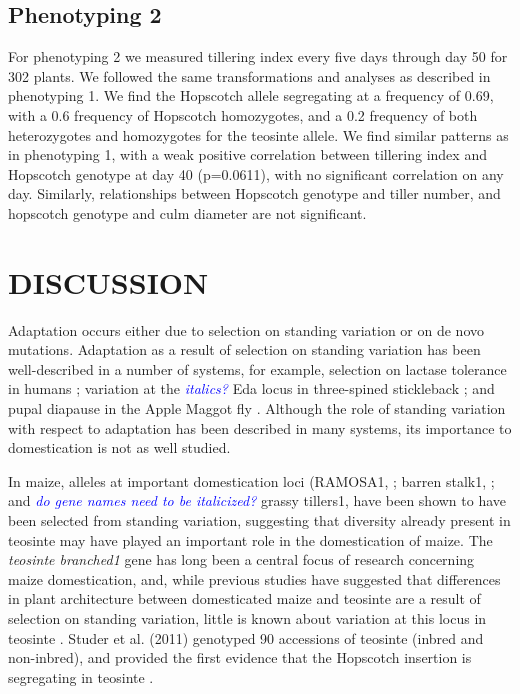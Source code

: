 \documentclass[12pt]{article}
\newcommand{\jri}[1]{\textcolor{blue}{ \emph{\scriptsize  #1}} }
\begin{document}
\subsection*{Phenotyping 2}

For phenotyping 2 we measured tillering index every five days through day 50 for 302 plants. We followed the same transformations and analyses as described in phenotyping 1. We find the Hopscotch allele segregating at a frequency of 0.69, with a 0.6 frequency of Hopscotch homozygotes, and a 0.2 frequency of both heterozygotes and homozygotes for the teosinte allele. We find similar patterns as in phenotyping 1, with a weak positive correlation between tillering index and Hopscotch genotype at day 40 (p=0.0611), with no significant correlation on any day. Similarly, relationships between Hopscotch genotype and tiller number, and hopscotch genotype and culm diameter are not significant. 


\section*{DISCUSSION}

Adaptation occurs either due to selection on standing variation or on de novo mutations. Adaptation as a result of selection on standing variation has been well-described in a number of systems, for example, selection on lactase tolerance in humans \cite{Plantinga et al 2012, Tishkoff et al 2007}; variation at the \jri{italics?} Eda locus in three-spined stickleback \cite{Kitano et al 2008, Colosimo et al 2005}; and pupal diapause in the Apple Maggot fly \cite{Feder et al 2003}. Although the role of standing variation with respect to adaptation has been described in many systems, its importance to domestication is not as well studied. 

In maize, alleles at important domestication loci (RAMOSA1, \cite{Sigmon and Vollbrecht 2010}; barren stalk1, \cite{Gallavotti et al 2004}; and \jri{do gene names need to be italicized?} grassy tillers1, \cite{Whipple et al 2011} have been shown to have been selected from standing variation, suggesting that diversity already present in teosinte may have played an important role in the domestication of maize. The \emph{teosinte branched1} gene has long been a central focus of research concerning maize domestication, and, while previous studies have suggested that differences in plant architecture between domesticated maize and teosinte are a result of selection on standing variation, little is known about variation at this locus in teosinte \cite{Clark et al 2006, Studer et al 2011}. Studer et al. (2011) genotyped 90 accessions of teosinte (inbred and non-inbred), and provided the first evidence that the Hopscotch insertion is segregating in teosinte \cite{Studer et al 2011}. 
\end{document}
